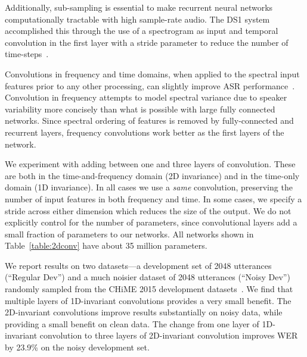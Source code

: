 \documentclass{article}
\begin{document}
Additionally, sub-sampling is essential to make recurrent neural networks computationally tractable with high sample-rate audio. The DS1 system accomplished this through the use of a spectrogram as input and temporal convolution in the first layer with a stride parameter to reduce the number of time-steps~\cite{hannun2014deepspeech}.

Convolutions in frequency and time domains, when applied to the spectral input features prior to any other processing, can slightly improve ASR performance~\cite{abdelhamid2012, sainath2013cnn, soltau2014}. Convolution in frequency attempts to model spectral variance due to speaker variability more concisely than what is possible with large fully connected networks. Since spectral ordering of features is removed by fully-connected and recurrent layers, frequency convolutions work better as the first layers of the network.

We experiment with adding between one and three layers of convolution. These are both in the time-and-frequency domain (2D invariance) and in the time-only domain (1D invariance). In all cases we use a \emph{same} convolution, preserving the number of input features in both frequency and time. In some cases, we specify a stride across either dimension which reduces the size of the output. We do not explicitly control for the number of parameters, since convolutional layers add a small fraction of parameters to our networks. All networks shown in Table~\ref{table:2dconv} have about 35 million parameters.

We report results on two datasets---a development set of 2048 utterances (``Regular Dev'') and a much noisier dataset of 2048 utterances (``Noisy Dev'') randomly sampled from the CHiME 2015 development datasets~\cite{barker2015chime}. We find that multiple layers of 1D-invariant convolutions provides a very small benefit. The 2D-invariant convolutions improve results substantially on noisy data, while providing a small benefit on clean data. The change from one layer of 1D-invariant convolution to three layers of 2D-invariant convolution improves WER by 23.9\% on the noisy development set.
\end{document}
